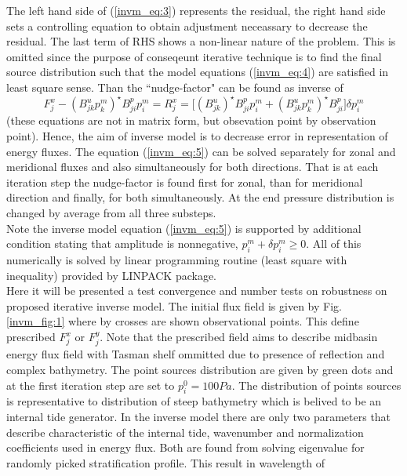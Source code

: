 \documentclass[12pt]{article}
\begin{document}
The left hand side of (\ref{invm_eq:3}) represents the residual, the right hand side sets a 
controlling equation to obtain adjustment neceassary to decrease the residual. The last term of 
RHS 
shows a non-linear nature of the problem. This is omitted since the purpose of conseqeunt 
iterative 
technique is to find the final source distribution such that the model equations (\ref{invm_eq:4}) 
are satisfied in least square sense. Than the ``nudge-factor" can be found as inverse of 
\begin{equation}
F_{j}^x - (B^u_{jk} p^m_k)^{\star} B^p_{ji}{p^m_i} = R_j^x = \Big[ (B^u_{jk} )^{\star} B^p_{ji} 
p^m_i + (B^u_{jk} p^m_k)^{\star} B^p_{ji} \Big] \delta p^m_i \label{invm_eq:5}
\end{equation}
(these equations are not in matrix form, but obsevation point by observation point).
Hence, the aim of inverse model is to decrease error in representation of energy fluxes. The 
equation (\ref{invm_eq:5}) can be solved separately for zonal and meridional fluxes and also 
simultaneously for both directions. That is at each iteration step the nudge-factor is found first 
for zonal, than for meridional direction and finally, for both simultaneously. At the end pressure 
distribution is changed by average from all three substeps.\\
Note the inverse model equation (\ref{invm_eq:5}) is supported by additional condition stating 
that 
amplitude is nonnegative, $p_i^m + \delta p_i^m \geq 0$. All of this numerically is solved by 
linear programming routine  (least square with inequality) provided by LINPACK 
package.\\
Here it will be presented a test convergence and number tests on robustness on proposed iterative 
inverse model. The initial flux field is given by Fig. \ref{invm_fig:1} where by crosses are shown 
observational points. This define prescribed $F_{j}^x$ or $F_{j}^y$. Note that the prescribed 
field 
aims to describe midbasin energy flux field with Tasman shelf ommitted due to presence of 
reflection and complex bathymetry. The point sources distribution are given by green dots and at 
the first iteration step are set to $p^0_i = 100 Pa$. The distribution of points sources is 
representative to distribution of steep bathymetry which is belived to be an internal tide 
generator. In the inverse model there are only two parameters that describe characteristic of the 
internal tide, wavenumber and normalization coefficients used in energy flux. Both are found from 
solving eigenvalue for randomly picked stratification profile. This result in wavelength of 
\end{document}

